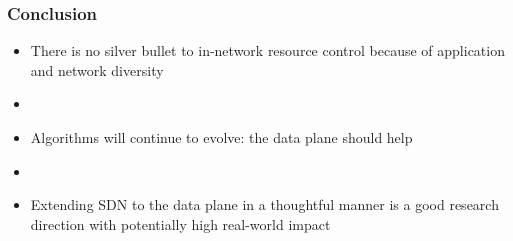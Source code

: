 \begin{frame}[plain]

\frametitle{Conclusion}
\begin{itemize}

\item There is no silver bullet to in-network resource control because
  of application and network diversity

\item[]
\item Algorithms will continue to evolve: the data plane should help

\item[]
\item Extending SDN to the data plane in a thoughtful manner is a good
  research direction with potentially high real-world impact

\end{itemize}
\end{frame}
